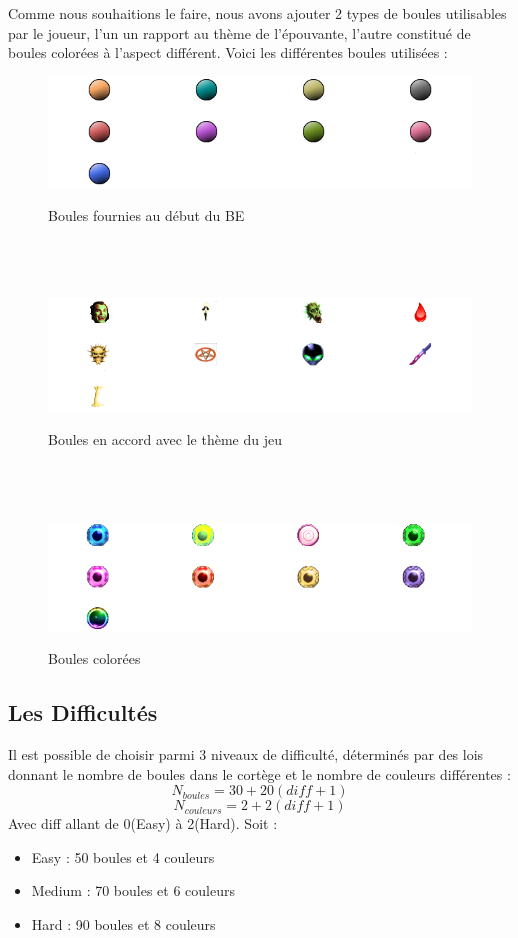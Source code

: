 Comme nous souhaitions le faire, nous avons ajouter 2 types de boules utilisables par le joueur, l'un un rapport au thème de l'épouvante, l'autre constitué de boules colorées à l'aspect différent.
Voici les différentes boules utilisées :
\begin{figure}[H]
\begin{center}
\includegraphics[scale=0.5]{img/boules1.png}
\caption {Boules fournies au début du BE}
~\\
~\\
~\\
\includegraphics[scale=0.5]{img/boules2.png}
\caption {Boules en accord avec le thème du jeu}
~\\
~\\
~\\
\includegraphics[scale=0.5]{img/boules3.png}
\caption {Boules colorées}
\end{center}
\end{figure}

\subsection{Les Difficultés}
Il est possible de choisir parmi 3 niveaux de difficulté, déterminés par des lois donnant le nombre de boules dans le cortège et le nombre de couleurs différentes :
$$N_{boules}=30+20(diff+1)$$
$$N_{couleurs}=2+2(diff+1)$$
Avec diff allant de 0(Easy) à 2(Hard). Soit :
\begin{itemize}
  \item Easy : 50 boules et 4 couleurs
  \item Medium : 70 boules et 6 couleurs
  \item Hard : 90 boules et 8 couleurs
\end{itemize} 
